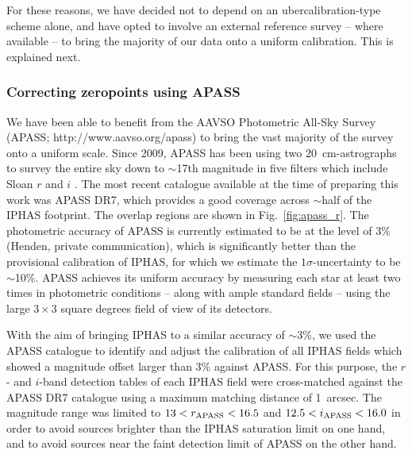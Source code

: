 \documentclass[useAMS,usenatbib]{mn2e}
\begin{document}
For these reasons, we have decided not to depend
on an ubercalibration-type scheme alone,
and have opted to involve an external reference survey
-- where available --
to bring the majority of our data onto a uniform calibration.
This is explained next.

\subsubsection{Correcting zeropoints using APASS}

We have been able to benefit from the
AAVSO Photometric All-Sky Survey
(APASS; http://www.aavso.org/apass)
to bring the vast majority of the survey 
onto a uniform scale.
Since 2009,
APASS has been using two 20~cm-astrographs
to survey the entire sky down to $\sim$17th magnitude
in five filters which include Sloan $r$ and $i$ \citep{Henden2012}.
The most recent catalogue available 
at the time of preparing this work was APASS DR7,
which provides a good coverage across $\sim$half
of the IPHAS footprint.
The overlap regions are shown in Fig.~\ref{fig:apass_r}.
The photometric accuracy of APASS is currently estimated 
to be at the level of 3\% (Henden, private communication),
which is significantly better 
than the provisional calibration of IPHAS,
for which we estimate the $1\sigma$-uncertainty to be $\sim$10\%.
APASS achieves its uniform accuracy 
by measuring each star at least two times in photometric conditions
-- along with ample standard fields --
using the large $3\times3$ square degrees field of view of its detectors.

With the aim of bringing IPHAS to a similar accuracy of $\sim$3\%,
we used the APASS catalogue to identify and adjust the calibration of all IPHAS fields 
which showed a magnitude offset larger than 3\% against APASS.
For this purpose,
the $r$- and $i$-band detection tables of each IPHAS field
were cross-matched against the APASS DR7 catalogue 
using a maximum matching distance of 1~arcsec.
The magnitude range was limited to
$13<r_{\rm APASS}<16.5$ and $12.5<i_{\rm APASS}<16.0$
in order to avoid sources 
brighter than the IPHAS saturation limit on one hand, 
and to avoid sources near the faint detection limit of APASS 
on the other hand.
\end{document}
